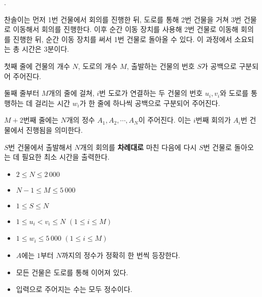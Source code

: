 \begin{problem}{\probno{}. \probtitle{}}

찬솔이는 먼저 1번 건물에서 회의를 진행한 뒤, 도로를 통해 2번 건물을 거쳐 3번 건물로 이동해서 회의를 진행한다. 이후 순간 이동 장치를 사용해 2번 건물로 이동해 회의를 진행한 뒤, 순간 이동 장치를 써서 1번 건물로 돌아올 수 있다. 이 과정에서 소요되는 총 시간은 3분이다.

\InputFile

첫째 줄에 건물의 개수 $N$, 도로의 개수 $M$, 출발하는 건물의 번호 $S$가 공백으로 구분되어 주어진다.

둘째 줄부터 $M$개의 줄에 걸쳐, $i$번 도로가 연결하는 두 건물의 번호 $u_i, v_i$와 도로를 통행하는 데 걸리는 시간 $w_i$가 한 줄에 하나씩 공백으로 구분되어 주어진다.

$M+2$번째 줄에는 $N$개의 정수 $A_1, A_2, \cdots, A_N$이 주어진다. 이는 $i$번째 회의가 $A_i$번 건물에서 진행됨을 의미한다.

\newpage

\OutputFile

$S$번 건물에서 출발해서 $N$개의 회의를 \textbf{차례대로} 마친 다음에 다시 $S$번 건물로 돌아오는 데 필요한 최소 시간을 출력한다.

\Constraints

\begin{itemize}[noitemsep]
    \item $2 \leq N \leq 2\,000$
    \item $N-1 \leq M \leq 5\,000$
    \item $1 \leq S \leq N$
    \item $1 \leq u_i < v_i \leq N$ $(1 \le i \le M)$
    \item $1 \leq w_i \leq 5\,000$ $(1 \le i \le M)$
    \item $A$에는 $1$부터 $N$까지의 정수가 정확히 한 번씩 등장한다.
    \item 모든 건물은 도로를 통해 이어져 있다.
    \item 입력으로 주어지는 수는 모두 정수이다.
\end{itemize}

\Example

\begin{example}
\end{example}




\end{problem}